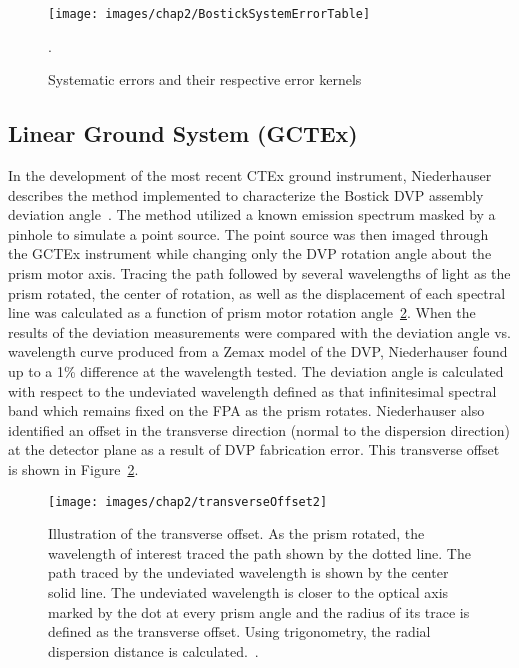 \begin{figure}[htb]		%
\centering
\texttt{[image: images/chap2/BostickSystemErrorTable]}
\caption{Systematic errors and their respective error kernels~\cite{Bostick}}.
\label{fig:BostickSystemErrorTable}
\end{figure}

\subsection{Linear Ground System (GCTEx)}
\label{sec:GCTEx}
In the development of the most recent \ac{CTEx} ground instrument, Niederhauser describes the method implemented to characterize the Bostick \ac{DVP} assembly deviation angle~\cite{Niederhauser}. The method utilized a known emission spectrum masked by a pinhole to simulate a point source. The point source was then imaged through the \ac{GCTEx} instrument while changing only the \ac{DVP} rotation angle about the prism motor axis. Tracing the path followed by several wavelengths of light as the prism rotated, the center of rotation, as well as the displacement of each spectral line was calculated as a function of prism motor rotation angle~\ref{fig:transverseOffset2}. When the results of the deviation measurements were compared with the deviation angle vs. wavelength curve produced from a Zemax model of the \ac{DVP}, Niederhauser found up to a 1\% difference at the wavelength tested. The deviation angle is calculated with respect to the undeviated wavelength defined as that infinitesimal spectral band which remains fixed on the \ac{FPA} as the prism rotates. Niederhauser also identified an offset in the transverse direction (normal to the dispersion direction) at the detector plane as a result of \ac{DVP} fabrication error. This transverse offset is shown in Figure~\ref{fig:transverseOffset2}.

\begin{figure}[htb]		%
\centering
\texttt{[image: images/chap2/transverseOffset2]}
\caption{Illustration of the transverse offset. As the prism rotated, the wavelength of interest traced the path shown by the dotted line. The path traced by the undeviated wavelength is shown by the center solid line. The undeviated wavelength is closer to the optical axis marked by the dot at every prism angle and the radius of its trace is defined as the transverse offset. Using trigonometry, the radial dispersion distance is calculated.~\cite{Niederhauser}.}
\label{fig:transverseOffset2}
\end{figure}

